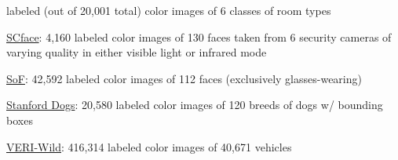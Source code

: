 \documentclass{tufte-handout}
\begin{document}
  labeled (out of 20,001 total) color images of 6 classes of room types
\item
  \href{http://www.scface.org/}{SCface}: 4,160 labeled color images of
  130 faces taken from 6 security cameras of varying quality in either
  visible light or infrared mode
\item
  \href{https://sites.google.com/view/sof-dataset}{SoF}: 42,592 labeled
  color images of 112 faces (exclusively glasses-wearing)
\item
  \href{http://vision.stanford.edu/aditya86/ImageNetDogs/}{Stanford
  Dogs}: 20,580 labeled color images of 120 breeds of dogs w/ bounding
  boxes
\item
  \href{https://github.com/PKU-IMRE/VERI-Wild}{VERI-Wild}: 416,314
  labeled color images of 40,671 vehicles
\ei
\end{document}
